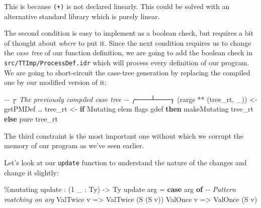 \documentclass[
]{article}
\newenvironment{Shaded}{}{}
\newcommand{\CommentTok}[1]{\textcolor[rgb]{0.38,0.63,0.69}{\textit{#1}}}
\newcommand{\DataTypeTok}[1]{\textcolor[rgb]{0.56,0.13,0.00}{#1}}
\newcommand{\DecValTok}[1]{\textcolor[rgb]{0.25,0.63,0.44}{#1}}
\newcommand{\FunctionTok}[1]{\textcolor[rgb]{0.02,0.16,0.49}{#1}}
\newcommand{\KeywordTok}[1]{\textcolor[rgb]{0.00,0.44,0.13}{\textbf{#1}}}
\newcommand{\NormalTok}[1]{#1}
\newcommand{\OperatorTok}[1]{\textcolor[rgb]{0.40,0.40,0.40}{#1}}
\newcommand{\OtherTok}[1]{\textcolor[rgb]{0.00,0.44,0.13}{#1}}
\begin{document}
This is because \texttt{(+)} is not declared linearly. This could be
solved with an alternative standard library which is purely linear.

The second condition is easy to implement as a boolean check, but
requires a bit of thought about \emph{where} to put it. Since the next
condition requires us to change the \emph{case tree} of our function
definition, we are going to add the boolean check in
\texttt{src/TTImp/ProcessDef.idr} which will process every definition of
our program. We are going to short-circuit the case-tree generation by
replacing the compiled one by our modified version of it:

\begin{Shaded}
\begin{Highlighting}[]
\CommentTok{{-}{-}            ┌ The previously compiled case tree}
\CommentTok{{-}{-}        ╭───┴───╮}
\NormalTok{(rargs }\OperatorTok{**}\NormalTok{ (tree\_rt\textquotesingle{}, \_)) }\OtherTok{\textless{}{-}}\NormalTok{ getPMDef …}
\NormalTok{tree\_rt }\OtherTok{\textless{}{-}} \KeywordTok{if} \DataTypeTok{Mutating} \OtherTok{\textasciigrave{}elem\textasciigrave{}}\NormalTok{ flags gdef}
              \KeywordTok{then}\NormalTok{ makeMutating tree\_rt\textquotesingle{}}
              \KeywordTok{else} \FunctionTok{pure}\NormalTok{ tree\_rt\textquotesingle{}}
\end{Highlighting}
\end{Shaded}

The third constraint is the most important one without which we corrupt
the memory of our program as we've seen earlier.

Let's look at our \texttt{update} function to understand the nature of
the changes and change it slightly:

\begin{Shaded}
\begin{Highlighting}[]
\OperatorTok{\%}\NormalTok{mutating}
\NormalTok{update }\OperatorTok{:}\NormalTok{ (}\DecValTok{1}\NormalTok{ \_ }\OperatorTok{:} \DataTypeTok{Ty}\NormalTok{) }\OtherTok{{-}\textgreater{}} \DataTypeTok{Ty}
\NormalTok{update arg }\OtherTok{=} \KeywordTok{case}\NormalTok{ arg }\KeywordTok{of} \CommentTok{{-}{-} Pattern matching on arg}
                  \DataTypeTok{ValTwice}\NormalTok{ v }\OtherTok{=\textgreater{}} \DataTypeTok{ValTwice}\NormalTok{ (}\DataTypeTok{S}\NormalTok{ (}\DataTypeTok{S}\NormalTok{ v))}
                  \DataTypeTok{ValOnce}\NormalTok{ v }\OtherTok{=\textgreater{}} \DataTypeTok{ValOnce}\NormalTok{ (}\DataTypeTok{S}\NormalTok{ v)}
\end{Highlighting}
\end{Shaded}
\end{document}
